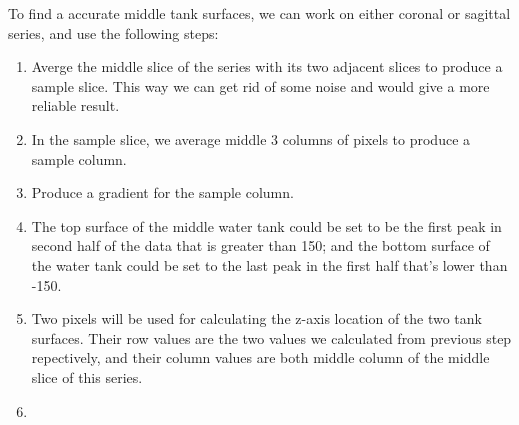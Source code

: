 To find a accurate middle tank surfaces, we can work on either coronal or sagittal series, and use the
following steps:

\begin{enumerate}
\item Averge the middle slice of the series with its two adjacent slices to produce a sample slice. This 
  way we can get rid of some noise and would give a more reliable result.
\item In the sample slice, we average middle 3 columns of pixels to produce a sample column.
\item Produce a gradient for the sample column. 
\item The top surface of the middle water tank could be set to be the first peak in second half 
  of the data that is greater than 150; and the bottom surface of the water tank could be set to the 
  last peak in the first half that's lower than -150. 
\item Two pixels will be used for calculating the z-axis location of the two tank surfaces. Their row
  values are the two values we calculated from previous step repectively, and their column values are both
  middle column of the middle slice of this series.
\item 
\end{enumerate}